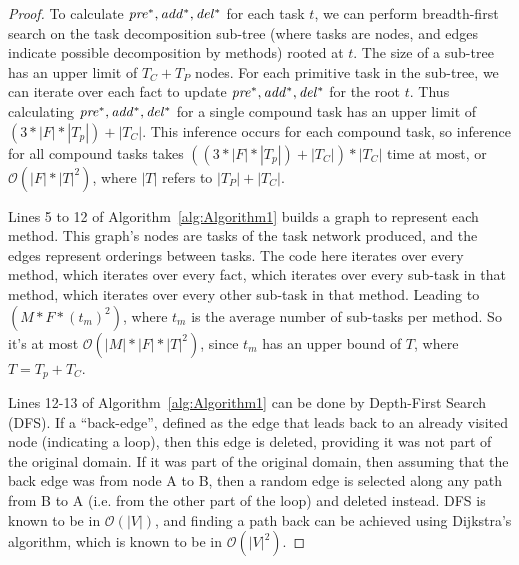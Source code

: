 \documentclass[runningheads]{llncs}
\begin{document}
\begin{proof}  %
To calculate $\mathit{pre^{*}}, \mathit{add^{*}}, \mathit{del^{*}}$ for each task $t$, we can perform breadth-first search on the task decomposition sub-tree (where tasks are nodes, and edges indicate possible decomposition by methods) rooted at $t$. The size of a sub-tree has an upper limit of $T_C + T_P$ nodes. For each primitive task in the sub-tree, we can iterate over each fact to update $\mathit{pre^{*}}, \mathit{add^{*}}, \mathit{del^{*}}$ for the root $t$. Thus calculating  $\mathit{pre^{*}}, \mathit{add^{*}}, \mathit{del^{*}}$ for a single compound task has an upper limit of $(3 * |F| * |T_p|) + |T_C|$. This inference occurs for each compound task, so inference for all compound tasks takes $((3 * |F| * |T_p|) + |T_C|) * |T_C|$ time at most, or $\mathcal{O}(|F| * |T|^2)$, where $|T|$ refers to $|T_P| + |T_C|$.


Lines 5 to 12 of Algorithm~\ref{alg:Algorithm1} builds a graph to represent each method. This graph's nodes are tasks of the task network produced, and the edges represent orderings between tasks. The code here iterates over every method, which iterates over every fact, which iterates over every sub-task in that method, which iterates over every other sub-task in that method. Leading to $(M * F * (t_m)^2)$, where $t_m$ is the average number of sub-tasks per method. So it's at most $\mathcal{O}(|M| * |F| * |T|^2)$, since $t_m$ has an upper bound of $T$, where $T=T_p + T_C$.

Lines 12-13 of Algorithm~\ref{alg:Algorithm1} can be done by Depth-First Search (DFS). If a \enquote{back-edge}, defined as the edge that leads back to an already visited node (indicating a loop), then this edge is deleted, providing it was not part of the original domain. If it was part of the original domain, then assuming that the back edge was from node A to B, then a random edge is selected along any path from B to A (i.e. from the other part of the loop) and deleted instead.
DFS is known to be in $\mathcal{O}(|V|)$, and finding a path back can be achieved using Dijkstra's algorithm, which is known to be in $\mathcal{O}(|V|^2)$.
 

\end{proof}
\end{document}

